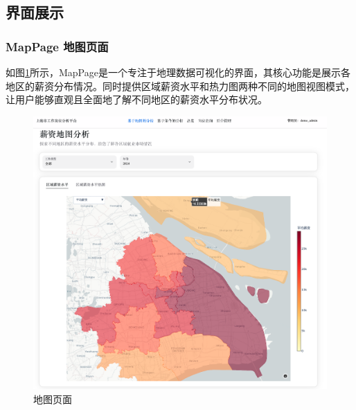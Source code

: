 \subsection{界面展示}

\subsubsection{MapPage 地图页面}
如图\ref{fig:map_page}所示，MapPage是一个专注于地理数据可视化的界面，其核心功能是展示各地区的薪资分布情况。同时提供区域薪资水平和热力图两种不同的地图视图模式，让用户能够直观且全面地了解不同地区的薪资水平分布状况。


\begin{figure}[htbp]
    \centering
    \includegraphics[width=1.0\textwidth]{figures/map_page.png}
    \caption{地图页面}
    \label{fig:map_page}
\end{figure}

